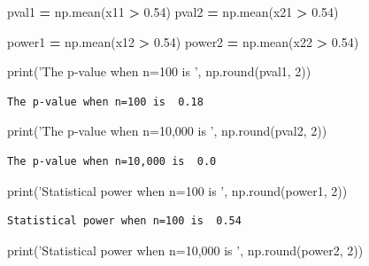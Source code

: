 \documentclass[
  letterpaper,
]{scrbook}
\newenvironment{Shaded}{\begin{snugshade}}{\end{snugshade}}
\newcommand{\BuiltInTok}[1]{#1}
\newcommand{\DecValTok}[1]{\textcolor[rgb]{0.00,0.00,0.81}{#1}}
\newcommand{\FloatTok}[1]{\textcolor[rgb]{0.00,0.00,0.81}{#1}}
\newcommand{\NormalTok}[1]{#1}
\newcommand{\OperatorTok}[1]{\textcolor[rgb]{0.81,0.36,0.00}{\textbf{#1}}}
\newcommand{\StringTok}[1]{\textcolor[rgb]{0.31,0.60,0.02}{#1}}
\begin{document}
\begin{Shaded}
\begin{Highlighting}[]
\NormalTok{pval1 }\OperatorTok{=}\NormalTok{ np.mean(x11 }\OperatorTok{>} \FloatTok{0.54}\NormalTok{)}
\NormalTok{pval2 }\OperatorTok{=}\NormalTok{ np.mean(x21 }\OperatorTok{>} \FloatTok{0.54}\NormalTok{)}

\NormalTok{power1 }\OperatorTok{=}\NormalTok{ np.mean(x12 }\OperatorTok{>} \FloatTok{0.54}\NormalTok{)}
\NormalTok{power2 }\OperatorTok{=}\NormalTok{ np.mean(x22 }\OperatorTok{>} \FloatTok{0.54}\NormalTok{)}

\BuiltInTok{print}\NormalTok{(}\StringTok{'The p-value when n=100 is '}\NormalTok{, np.}\BuiltInTok{round}\NormalTok{(pval1, }\DecValTok{2}\NormalTok{))}
\end{Highlighting}
\end{Shaded}

\begin{verbatim}
The p-value when n=100 is  0.18
\end{verbatim}

\begin{Shaded}
\begin{Highlighting}[]
\BuiltInTok{print}\NormalTok{(}\StringTok{'The p-value when n=10,000 is '}\NormalTok{, np.}\BuiltInTok{round}\NormalTok{(pval2, }\DecValTok{2}\NormalTok{))}
\end{Highlighting}
\end{Shaded}

\begin{verbatim}
The p-value when n=10,000 is  0.0
\end{verbatim}

\begin{Shaded}
\begin{Highlighting}[]
\BuiltInTok{print}\NormalTok{(}\StringTok{'Statistical power when n=100 is '}\NormalTok{, np.}\BuiltInTok{round}\NormalTok{(power1, }\DecValTok{2}\NormalTok{))}
\end{Highlighting}
\end{Shaded}

\begin{verbatim}
Statistical power when n=100 is  0.54
\end{verbatim}

\begin{Shaded}
\begin{Highlighting}[]
\BuiltInTok{print}\NormalTok{(}\StringTok{'Statistical power when n=10,000 is '}\NormalTok{, np.}\BuiltInTok{round}\NormalTok{(power2, }\DecValTok{2}\NormalTok{))}
\end{Highlighting}
\end{Shaded}
\end{document}
